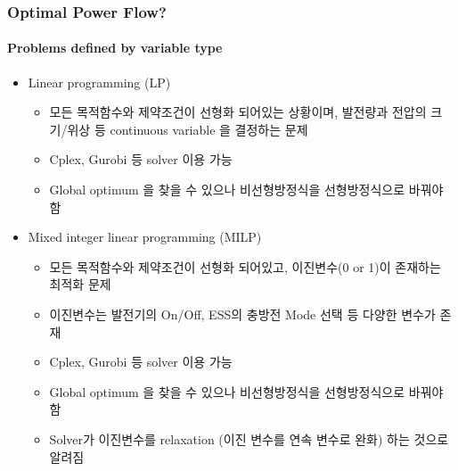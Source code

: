 \documentclass[
	11pt, %
	aspectratio=169, %
]{beamer}
\begin{document}

\begin{frame}
	\frametitle{Optimal Power Flow?}
	\framesubtitle{Problems defined by variable type} %
	
	\begin{itemize}
		\item Linear programming (LP)
		\begin{itemize}
			\item 모든 목적함수와 제약조건이 선형화 되어있는 상황이며, 발전량과 전압의 크기/위상 등 continuous variable 을 결정하는 문제
			\item Cplex, Gurobi 등 solver 이용 가능
			\item Global optimum 을 찾을 수 있으나 비선형방정식을 선형방정식으로 바꿔야 함
		\end{itemize}
		
		\item Mixed integer linear programming (MILP)
		\begin{itemize}
			\item 모든 목적함수와 제약조건이 선형화 되어있고, 이진변수(0 or 1)이 존재하는 최적화 문제
			\item 이진변수는 발전기의 On/Off, ESS의 충방전 Mode 선택 등 다양한 변수가 존재
			\item Cplex, Gurobi 등 solver 이용 가능
			\item Global optimum 을 찾을 수 있으나 비선형방정식을 선형방정식으로 바꿔야 함
			\item Solver가 이진변수를 relaxation (이진 변수를 연속 변수로 완화) 하는 것으로 알려짐
		\end{itemize}

	\end{itemize}
	
\end{frame}


\end{document}

